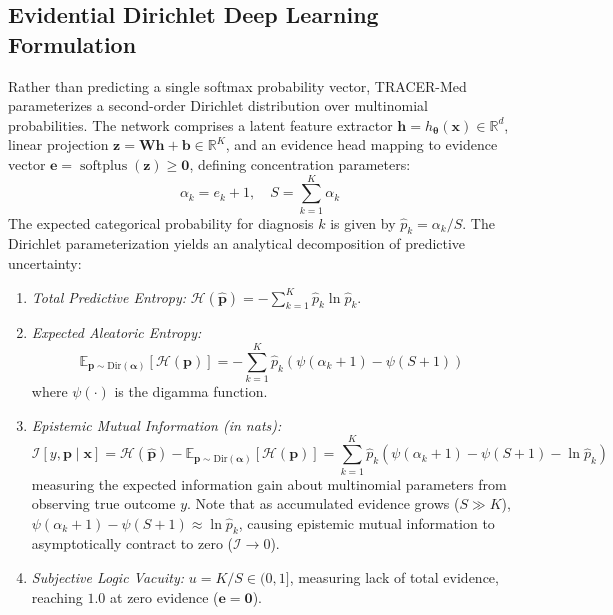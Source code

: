 \documentclass[3p,12pt]{elsarticle}
\theoremstyle{plain}
\theoremstyle{definition}
\begin{document}
\subsection{Evidential Dirichlet Deep Learning Formulation}
Rather than predicting a single softmax probability vector, TRACER-Med parameterizes a second-order Dirichlet distribution over multinomial probabilities. The network comprises a latent feature extractor $\mathbf{h} = h_{\boldsymbol{\theta}}(\mathbf{x}) \in \mathbb{R}^d$, linear projection $\mathbf{z} = \mathbf{W}\mathbf{h} + \mathbf{b} \in \mathbb{R}^K$, and an evidence head mapping to evidence vector $\mathbf{e} = \operatorname{softplus}(\mathbf{z}) \ge \mathbf{0}$, defining concentration parameters:
\begin{equation}
    \alpha_k = e_k + 1, \quad S = \sum_{k=1}^K \alpha_k
\end{equation}
The expected categorical probability for diagnosis $k$ is given by $\hat{p}_k = \alpha_k / S$. The Dirichlet parameterization yields an analytical decomposition of predictive uncertainty:
\begin{enumerate}
    \item \emph{Total Predictive Entropy:} $\mathcal{H}(\hat{\mathbf{p}}) = -\sum_{k=1}^K \hat{p}_k \ln \hat{p}_k$.
    \item \emph{Expected Aleatoric Entropy:}
    \begin{equation}
        \mathbb{E}_{\mathbf{p} \sim \text{Dir}(\boldsymbol{\alpha})}[\mathcal{H}(\mathbf{p})] = -\sum_{k=1}^K \hat{p}_k \left(\psi(\alpha_k + 1) - \psi(S + 1)\right)
    \end{equation}
    where $\psi(\cdot)$ is the digamma function.
    \item \emph{Epistemic Mutual Information (in nats):}
    \begin{equation}
        \mathcal{I}[y, \mathbf{p} \mid \mathbf{x}] = \mathcal{H}(\hat{\mathbf{p}}) - \mathbb{E}_{\mathbf{p} \sim \text{Dir}(\boldsymbol{\alpha})}[\mathcal{H}(\mathbf{p})] = \sum_{k=1}^K \hat{p}_k \left(\psi(\alpha_k + 1) - \psi(S + 1) - \ln \hat{p}_k\right)
    \end{equation}
    measuring the expected information gain about multinomial parameters from observing true outcome $y$. Note that as accumulated evidence grows ($S \gg K$), $\psi(\alpha_k + 1) - \psi(S + 1) \approx \ln \hat{p}_k$, causing epistemic mutual information to asymptotically contract to zero ($\mathcal{I} \to 0$).
    \item \emph{Subjective Logic Vacuity:} $u = K / S \in (0, 1]$, measuring lack of total evidence, reaching $1.0$ at zero evidence ($\mathbf{e} = \mathbf{0}$).
\end{enumerate}
\end{document}
